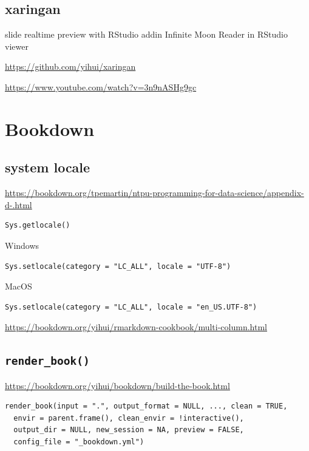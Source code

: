 \documentclass[
]{book}
\theoremstyle{definition}
\theoremstyle{definition}
\theoremstyle{definition}
\theoremstyle{definition}
\theoremstyle{remark}
\begin{document}
\hypertarget{xaringan}{%
\subsection{xaringan}\label{xaringan}}

slide realtime preview with RStudio addin Infinite Moon Reader in RStudio viewer

\url{https://github.com/yihui/xaringan}

\url{https://www.youtube.com/watch?v=3n9nASHg9gc}

\hypertarget{bookdown}{%
\section{Bookdown}\label{bookdown}}

\hypertarget{system-locale}{%
\subsection{system locale}\label{system-locale}}

\url{https://bookdown.org/tpemartin/ntpu-programming-for-data-science/appendix-d-.html}

\begin{verbatim}
Sys.getlocale()
\end{verbatim}

Windows

\begin{verbatim}
Sys.setlocale(category = "LC_ALL", locale = "UTF-8")
\end{verbatim}

MacOS

\begin{verbatim}
Sys.setlocale(category = "LC_ALL", locale = "en_US.UTF-8")
\end{verbatim}

\url{https://bookdown.org/yihui/rmarkdown-cookbook/multi-column.html}

\hypertarget{render_book}{%
\subsection{\texorpdfstring{\texttt{render\_book()}}{render\_book()}}\label{render_book}}

\url{https://bookdown.org/yihui/bookdown/build-the-book.html}

\begin{verbatim}
render_book(input = ".", output_format = NULL, ..., clean = TRUE,
  envir = parent.frame(), clean_envir = !interactive(),
  output_dir = NULL, new_session = NA, preview = FALSE,
  config_file = "_bookdown.yml")
\end{verbatim}
\end{document}
